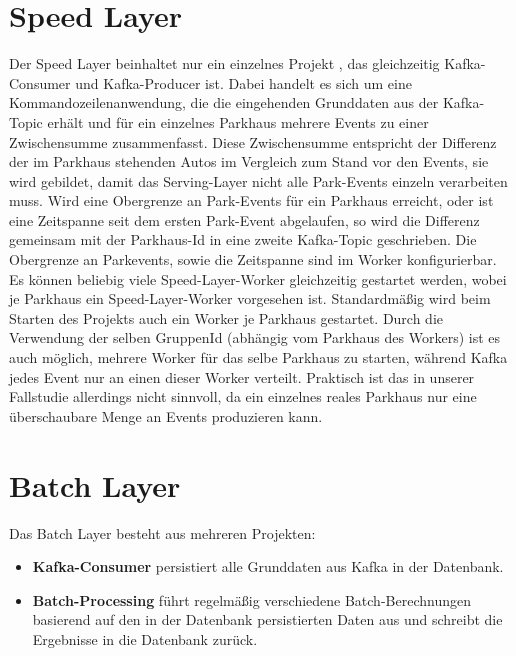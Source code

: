 \section{Speed Layer}
Der Speed Layer beinhaltet nur ein einzelnes Projekt , das gleichzeitig Kafka-Consumer und Kafka-Producer ist.
Dabei handelt es sich um eine Kommandozeilenanwendung, die die eingehenden Grunddaten aus der Kafka-Topic  erhält und für ein einzelnes Parkhaus mehrere Events zu einer Zwischensumme zusammenfasst.
Diese Zwischensumme entspricht der Differenz der im Parkhaus stehenden Autos im Vergleich zum Stand vor den Events, sie wird gebildet, damit das Serving-Layer nicht alle Park-Events einzeln verarbeiten muss.
Wird eine Obergrenze an Park-Events für ein Parkhaus erreicht, oder ist eine Zeitspanne seit dem ersten Park-Event abgelaufen, so wird die Differenz gemeinsam mit der Parkhaus-Id in eine zweite Kafka-Topic  geschrieben.
Die Obergrenze an Parkevents, sowie die Zeitspanne sind im Worker konfigurierbar.
Es können beliebig viele Speed-Layer-Worker gleichzeitig gestartet werden, wobei je Parkhaus ein Speed-Layer-Worker vorgesehen ist.
Standardmäßig wird beim Starten des Projekts auch ein Worker je Parkhaus gestartet.
Durch die Verwendung der selben GruppenId (abhängig vom Parkhaus des Workers) ist es auch möglich, mehrere Worker für das selbe Parkhaus zu starten, während Kafka jedes Event nur an einen dieser Worker verteilt.
Praktisch ist das in unserer Fallstudie allerdings nicht sinnvoll, da ein einzelnes reales Parkhaus nur eine überschaubare Menge an Events produzieren kann.


\section{Batch Layer}
Das Batch Layer besteht aus mehreren Projekten:
\begin{itemize}
    \item \textbf{Kafka-Consumer} persistiert alle Grunddaten aus Kafka in der Datenbank.
    \item \textbf{Batch-Processing} führt regelmäßig verschiedene Batch-Berechnungen basierend auf den in der Datenbank persistierten Daten aus und schreibt die Ergebnisse in die Datenbank zurück. 
\end{itemize}

